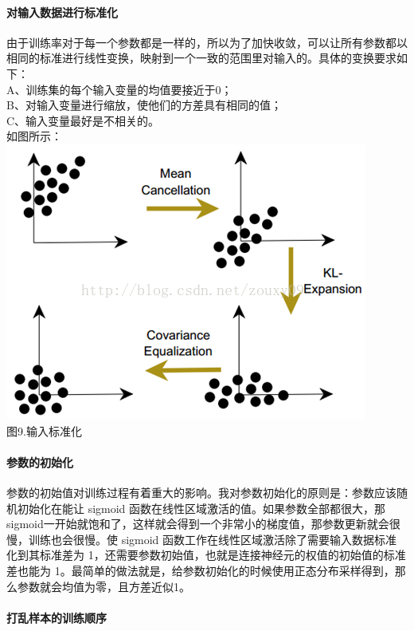 \paragraph{对输入数据进行标准化}\label{ux5bf9ux8f93ux5165ux6570ux636eux8fdbux884cux6807ux51c6ux5316}

由于训练率对于每一个参数都是一样的，所以为了加快收敛，可以让所有参数都以相同的标准进行线性变换，映射到一个一致的范围里对输入的。具体的变换要求如下：\\A、训练集的每个输入变量的均值要接近于0；\\B、对输入变量进行缩放，使他们的方差具有相同的值；\\C、输入变量最好是不相关的。\\如图所示：\\\includegraphics{picture/normalizing-the-inputs.png}\\图9.输入标准化

\paragraph{参数的初始化}\label{ux53c2ux6570ux7684ux521dux59cbux5316}

参数的初始值对训练过程有着重大的影响。我对参数初始化的原则是：参数应该随机初始化在能让
sigmoid
函数在线性区域激活的值。如果参数全部都很大，那sigmoid一开始就饱和了，这样就会得到一个非常小的梯度值，那参数更新就会很慢，训练也会很慢。使
sigmoid 函数工作在线性区域激活除了需要输入数据标准化到其标准差为
1，还需要参数初始值，也就是连接神经元的权值的初始值的标准差也能为
1。最简单的做法就是，给参数初始化的时候使用正态分布采样得到，那么参数就会均值为零，且方差近似1。

\paragraph{打乱样本的训练顺序}\label{ux6253ux4e71ux6837ux672cux7684ux8badux7ec3ux987aux5e8f}


